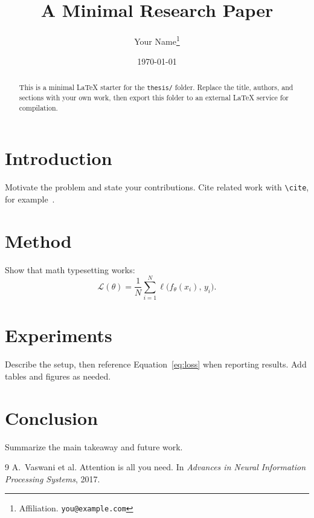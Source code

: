 \documentclass[11pt]{article}
\title{A Minimal Research Paper}
\author{Your Name\thanks{Affiliation. \texttt{you@example.com}}}
\date{\today}
\begin{document}
\maketitle

\begin{abstract}
This is a minimal \LaTeX{} starter for the \texttt{thesis/} folder. Replace the
title, authors, and sections with your own work, then export this folder to an external \LaTeX{} service for compilation.
\end{abstract}

\section{Introduction}
Motivate the problem and state your contributions. Cite related work with
\verb|\cite|, for example~\cite{vaswani2017attention}.

\section{Method}
Show that math typesetting works:
\begin{equation}
  \mathcal{L}(\theta)
  = \frac{1}{N} \sum_{i=1}^{N} \ell\bigl(f_{\theta}(x_i),\, y_i\bigr).
  \label{eq:loss}
\end{equation}

\section{Experiments}
Describe the setup, then reference Equation~\eqref{eq:loss} when reporting
results. Add tables and figures as needed.

\section{Conclusion}
Summarize the main takeaway and future work.

\begin{thebibliography}{9}
A.~Vaswani et al.
\newblock Attention is all you need.
\newblock In \emph{Advances in Neural Information Processing Systems}, 2017.
\end{thebibliography}
\end{document}
